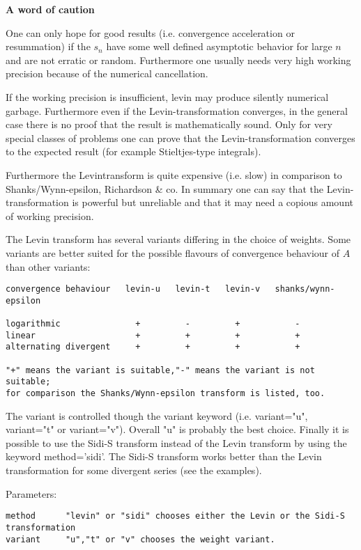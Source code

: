 \vpara
\textbf{A word of caution}

One can only hope for good results (i.e. convergence acceleration or resummation) if the $s_n$ have some well defined asymptotic behavior for large $n$ and are not erratic or random. Furthermore one usually needs very high working precision because of the numerical cancellation. 

If the working precision is insufficient, levin may produce silently numerical garbage. Furthermore even if the Levin-transformation converges, in the general case there is no proof that the result is mathematically sound. Only for very special classes of problems one can prove that the Levin-transformation converges to the expected result (for example Stieltjes-type integrals). 

Furthermore the Levintransform is quite expensive (i.e. slow) in comparison to Shanks/Wynn-epsilon, Richardson \& co. In summary one can say that the Levin-transformation is powerful but unreliable and that it may need a copious amount of working precision.

\vpara
The Levin transform has several variants differing in the choice of weights. Some variants are better suited for the possible flavours of convergence behaviour of $A$ than other variants:

\begin{lstlisting}
convergence behaviour   levin-u   levin-t   levin-v   shanks/wynn-epsilon

logarithmic               +         -         +           -
linear                    +         +         +           +
alternating divergent     +         +         +           +

"+" means the variant is suitable,"-" means the variant is not suitable;
for comparison the Shanks/Wynn-epsilon transform is listed, too.
\end{lstlisting}

The variant is controlled though the variant keyword (i.e. variant="u", variant="t" or variant="v"). Overall "u" is probably the best choice.
Finally it is possible to use the Sidi-S transform instead of the Levin transform by using the keyword method='sidi'. The Sidi-S transform works better than the Levin transformation for some divergent series (see the examples).

Parameters:

\begin{lstlisting}
method      "levin" or "sidi" chooses either the Levin or the Sidi-S transformation
variant     "u","t" or "v" chooses the weight variant.
\end{lstlisting}

